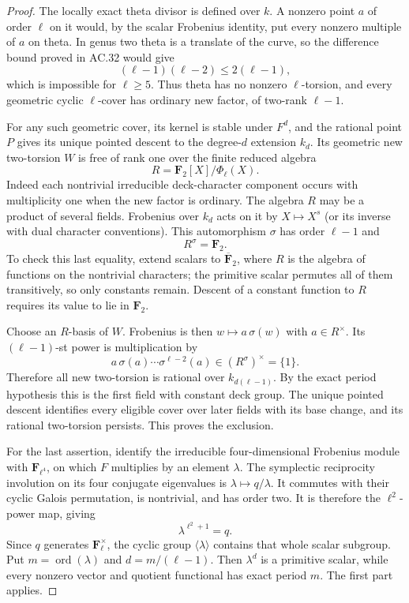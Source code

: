 \begin{proof}
The locally exact theta divisor is defined over \(k\).
A nonzero point \(a\) of order \(\ell\) on it would, by the
scalar Frobenius identity, put every nonzero multiple of \(a\)
on theta. In genus two theta is a translate of the curve,
so the difference bound proved in AC.32 would give
\[
                    (\ell-1)(\ell-2)\le2(\ell-1),
\]
which is impossible for \(\ell\ge5\).
Thus theta has no nonzero \(\ell\)-torsion, and every geometric
cyclic \(\ell\)-cover has ordinary new factor, of two-rank
\(\ell-1\).

For any such geometric cover, its kernel is stable under
\(F^d\), and the rational point \(P\) gives its unique pointed
descent to the degree-\(d\) extension \(k_d\).
Its geometric new two-torsion \(W\) is free of rank one over
the finite reduced algebra
\[
              R=\mathbf F_2[X]/\Phi_\ell(X).
\]
Indeed each nontrivial irreducible deck-character component
occurs with multiplicity one when the new factor is ordinary.
The algebra \(R\) may be a product of several fields.
Frobenius over \(k_d\) acts on it by \(X\mapsto X^s\)
(or its inverse with dual character conventions).
This automorphism \(\sigma\) has order \(\ell-1\) and
\[
                              R^\sigma=\mathbf F_2.
\]
To check this last equality, extend scalars to
\(\overline{\mathbf F}_2\), where \(R\) is the algebra of
functions on the nontrivial characters; the primitive scalar
permutes all of them transitively, so only constants remain.
Descent of a constant function to \(R\) requires its value to
lie in \(\mathbf F_2\).

Choose an \(R\)-basis of \(W\). Frobenius is then
\(w\mapsto a\,\sigma(w)\) with \(a\in R^\times\).
Its \((\ell-1)\)-st power is multiplication by
\[
                 a\,\sigma(a)\cdots\sigma^{\ell-2}(a)
                         \in(R^\sigma)^\times=\{1\}.
\]
Therefore all new two-torsion is rational over
\(k_{d(\ell-1)}\). By the exact period hypothesis this is the
first field with constant deck group. The unique pointed
descent identifies every eligible cover over later fields
with its base change, and its rational two-torsion persists.
This proves the exclusion.

For the last assertion, identify the irreducible
four-dimensional Frobenius module with
\(\mathbf F_{\ell^4}\), on which \(F\) multiplies by an
element \(\lambda\).
The symplectic reciprocity involution on its four conjugate
eigenvalues is \(\lambda\mapsto q/\lambda\).
It commutes with their cyclic Galois permutation, is nontrivial,
and has order two. It is therefore the \(\ell^2\)-power map,
giving
\[
                         \lambda^{\ell^2+1}=q.
\]
Since \(q\) generates \(\mathbf F_\ell^\times\),
the cyclic group \(\langle\lambda\rangle\) contains that whole
scalar subgroup. Put \(m=\operatorname{ord}(\lambda)\) and
\(d=m/(\ell-1)\). Then \(\lambda^d\) is a primitive scalar,
while every nonzero vector and quotient functional has exact
period \(m\). The first part applies.
\end{proof}

